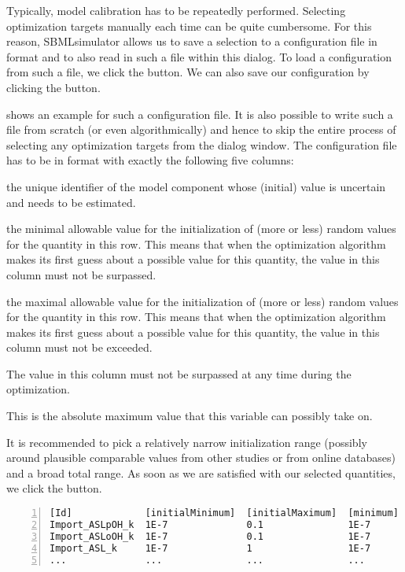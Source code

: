 Typically, model calibration has to be repeatedly performed.
Selecting optimization targets manually each time can be quite cumbersome.
For this reason, SBMLsimulator allows us to save a selection to a configuration file in \CSV format and to also read in such a file within this dialog.
To load a configuration from such a file, we click the  button.
We can also save our configuration by clicking the  button.

 shows an example for such a configuration file.
It is also possible to write such a file from scratch (or even algorithmically) and hence to skip the entire process of selecting any optimization targets from the dialog window.
The configuration file has to be in \CSV format with exactly the following five columns:
\begin{description}
  \renewcommand{\makelabel}[1]{[\texttt{#1}]}
  \item[Id] the unique identifier of the model component whose (initial) value is uncertain and needs to be estimated.
  \item[initialMinimum] the minimal allowable value for the initialization of (more or less) random values for the quantity in this row.
  This means that when the optimization algorithm makes its first guess about a possible value for this quantity, the value in this column must not be surpassed.
  \item[initialMaximum]  the maximal allowable value for the initialization of (more or less) random values for the quantity in this row.
  This means that when the optimization algorithm makes its first guess about a possible value for this quantity, the value in this column must not be exceeded.
  \item[minimum] The value in this column must not be surpassed at any time during the optimization.
  \item[maximum] This is the absolute maximum value that this variable can possibly take on.
\end{description}
It is recommended to pick a relatively narrow initialization range (possibly around plausible comparable values from other studies or from online databases) and a broad total range.
As soon as we are satisfied with our selected quantities, we click the  button.
\begin{lstlisting}[caption={Input file example for parameter estimation file},label={lst:input:estimation},numbers=left,captionpos=t,float=h]
[Id]             [initialMinimum]  [initialMaximum]  [minimum]  [maximum]
Import_ASLpOH_k  1E-7              0.1               1E-7       0.1	
Import_ASLoOH_k  1E-7              0.1               1E-7       0.1	
Import_ASL_k     1E-7              1                 1E-7       1	
...              ...               ...               ...        ...
\end{lstlisting}

